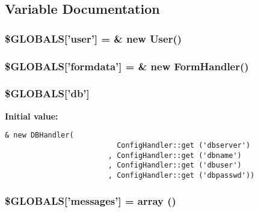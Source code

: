 \subsection{Variable Documentation}
\hypertarget{OWLloader_8php_6ca8a3deb7e1b32adc92d8cb72617832}{
\subsubsection{\setlength{\rightskip}{0pt plus 5cm}\$GLOBALS\mbox{[}'user'\mbox{]} = \& new {\bf User}()}}
\label{OWLloader_8php_6ca8a3deb7e1b32adc92d8cb72617832}


\hypertarget{OWLloader_8php_8589ac46db5e9bbb32368635933c4b42}{
\subsubsection{\setlength{\rightskip}{0pt plus 5cm}\$GLOBALS\mbox{[}'formdata'\mbox{]} = \& new {\bf FormHandler}()}}
\label{OWLloader_8php_8589ac46db5e9bbb32368635933c4b42}


\hypertarget{OWLloader_8php_14159e18d9b64fd1e16054f784eda311}{
\subsubsection{\setlength{\rightskip}{0pt plus 5cm}\$GLOBALS\mbox{[}'db'\mbox{]}}}
\label{OWLloader_8php_14159e18d9b64fd1e16054f784eda311}


\textbf{Initial value:}

\begin{Code}\begin{verbatim}& new DBHandler(
                          ConfigHandler::get ('dbserver')
                        , ConfigHandler::get ('dbname')
                        , ConfigHandler::get ('dbuser')
                        , ConfigHandler::get ('dbpasswd'))
\end{verbatim}
\end{Code}
\hypertarget{OWLloader_8php_65f2996116eed36e9ab25f254a470259}{
\subsubsection{\setlength{\rightskip}{0pt plus 5cm}\$GLOBALS\mbox{[}'messages'\mbox{]} = array ()}}
\label{OWLloader_8php_65f2996116eed36e9ab25f254a470259}


